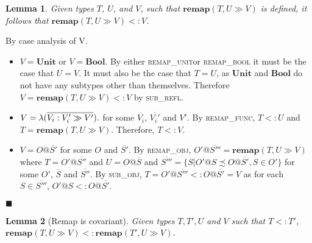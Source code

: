 \documentclass[preprint]{sigplanconf}
\newtheorem{lem}{Lemma}
\newcommand{\subrefl}{\textsc{sub\_refl}}
\newcommand{\subobj}{\textsc{sub\_obj}}
\newcommand{\remapunit}{\textsc{remap\_unit}}
\newcommand{\remapbool}{\textsc{remap\_bool}}
\newcommand{\remapfunc}{\textsc{remap\_func}}
\newcommand{\remapobj}{\textsc{remap\_obj}}
\newcommand{\remapapp}[3]{\ensuremath{\mathbf{remap}(#1, #2 \gg #3)}}
\newcommand{\unitt}{\mathbf{Unit}}
\newcommand{\boolt}{\mathbf{Bool}}
\newcommand{\funv}[4]{\lambda(\overline{#1 : #2 \gg #3}).#4}
\newcommand{\qed}{$\blacksquare$}
\newenvironment{proof}{\vspace{1ex}\noindent{\bf Proof}\hspace{0.5em}}
  {\hfill\qed\vspace{1ex}}
\begin{document}

\begin{lem}
\label{lem:remap}
Given types $T$, $U$, and $V$, such that
$\remapapp{T}{U}{V}$ is defined, it follows that $\remapapp{T}{U}{V} <: V$.
\end{lem}
\begin{proof}
By case analysis of V.

\begin{itemize}
\item $V = \unitt$ or $V = \boolt$. By either \remapunit or \remapbool
it must be the case that $U = V$. It must also be the case that
$T = U$, as $\unitt$ and $\boolt$ do not have any subtypes other than
themselves. Therefore $V = \remapapp{T}{U}{V} <: V$ by \subrefl.

\item $V = \funv{V_i}{V_i'}{V'}$ for some $\overline{V_i}$, $\overline{V_i'}$
and $V'$. By \remapfunc, $T <: U$ and $T = \remapapp{T}{U}{V}$. Therefore,
$T <: V$.

\item $V = O@\overline{S'}$ for some $O$ and $\overline{S'}$. By
\remapobj, $O'@\overline{S'''} = \remapapp{T}{U}{V}$ where 
$T = O'@\overline{S''}$ and $U = O@\overline{S}$ and
$\overline{S'''} = \{ S | O'@S \precsim O@\overline{S'}, S \in O' \}$ 
for some $O'$, $\overline{S}$ and $\overline{S''}$. By \subobj,
$T = O'@\overline{S'''} <: O@\overline{S'} = V$ as for each $S \in \overline{S'''}$,
$O'@S <: O@\overline{S'}$.
\end{itemize}
\end{proof}


\begin{lem}[Remap is covariant]
\label{lem:remapcv}
Given types $T, T', U$ and $V$ such that $T <: T'$, 
$\remapapp{T}{U}{V} <: \remapapp{T'}{U}{V}$.
\end{lem}
\end{document}
